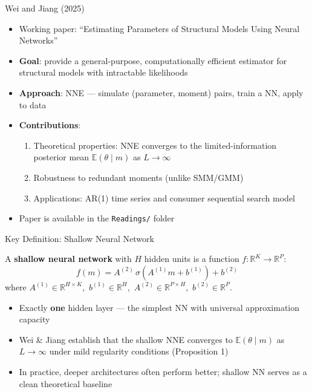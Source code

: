 \documentclass[aspectratio=169,professionalfonts]{beamer}
\newcommand{\hl}[1]{\textbf{\textcolor{UGARed}{#1}}}
\begin{document}
\begin{frame}{Wei and Jiang (2025)}
  \begin{itemize}
    \item Working paper: ``Estimating Parameters of Structural
          Models Using Neural Networks''
    \item \hl{Goal}: provide a general-purpose, computationally efficient estimator
          for structural models with intractable likelihoods
    \item \hl{Approach}: NNE --- simulate (parameter, moment) pairs, train a NN, apply to data
    \item \hl{Contributions}:
      \begin{enumerate}
        \item Theoretical properties: NNE converges to the limited-information
              posterior mean $\mathbb{E}(\theta \mid m)$ as $L \to \infty$
        \item Robustness to redundant moments (unlike SMM/GMM)
        \item Applications: AR(1) time series and consumer sequential search model
      \end{enumerate}
    \item Paper is available in the \texttt{Readings/} folder
  \end{itemize}
\end{frame}

\begin{frame}{Key Definition: Shallow Neural Network}
  \begin{tcolorbox}[colback=red!5!white, colframe=red!75!black,
                    title=\textbf{Definition: Shallow Neural Network}]
    A \hl{shallow neural network} with $H$ hidden units is a function
    $f : \mathbb{R}^K \to \mathbb{R}^P$:
    \[
      f(m) = A^{(2)}\,\sigma\!\left(A^{(1)} m + b^{(1)}\right) + b^{(2)}
    \]
    where $A^{(1)} \in \mathbb{R}^{H \times K}$,\ $b^{(1)} \in \mathbb{R}^H$,\
          $A^{(2)} \in \mathbb{R}^{P \times H}$,\ $b^{(2)} \in \mathbb{R}^P$.
  \end{tcolorbox}
  \begin{itemize}
    \item Exactly \textbf{one} hidden layer --- the simplest NN with universal approximation capacity
    \item Wei \& Jiang establish that the shallow NNE converges to $\mathbb{E}(\theta \mid m)$
          as $L \to \infty$ under mild regularity conditions (Proposition 1)
    \item In practice, deeper architectures often perform better;
          shallow NN serves as a clean theoretical baseline
  \end{itemize}
\end{frame}
\end{document}
